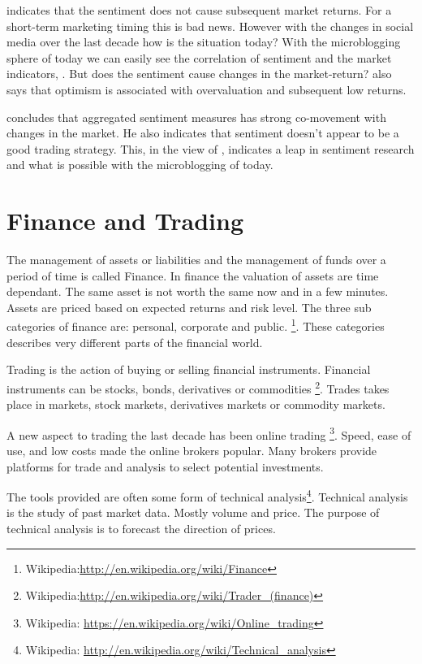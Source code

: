 \cite[p3]{Brown20041} indicates that the sentiment does not cause subsequent
market returns. For a short-term marketing timing this is bad news. However
with the changes in social media over the last decade how is the situation
today? With the microblogging sphere of today we can easily see the
correlation of sentiment and the market indicators,
\cite[]{annikajubbega11:twitter_driver_stock_price}. But
does the sentiment cause changes in the market-return?
\cite[p3]{Brown20041} also says that optimism is associated with overvaluation
and subsequent low returns.

\cite[p]{Brown20041} concludes that aggregated sentiment measures has strong
co-movement with changes in the market. He also indicates that sentiment
doesn't appear to be a good trading strategy. This, in the view of
\cite[]{Zhang201155}, indicates a leap in sentiment research and what is possible
with the microblogging of today.

\section{Finance and Trading}

The management of assets or liabilities and the management of funds over a
period of time is called Finance. In finance the valuation of assets are time
dependant. The same asset is not worth the same now and in a few minutes. Assets
are priced based on expected returns and risk level. The three sub categories
of finance are: personal, corporate and public. 
\footnote{Wikipedia:\url{http://en.wikipedia.org/wiki/Finance}}.
These categories describes very different parts of the financial world. 

Trading is the action of buying or selling financial instruments.
Financial instruments can be stocks, bonds, derivatives or commodities 
\footnote{Wikipedia:\url{http://en.wikipedia.org/wiki/Trader_(finance)}}.
Trades takes place in markets, stock markets, derivatives markets or commodity
markets.

A new aspect to trading the last decade has been online trading
\footnote{Wikipedia: \url{https://en.wikipedia.org/wiki/Online_trading}}.
Speed, ease of use, and low costs made the online brokers popular. Many brokers
provide platforms for trade and analysis to select potential investments.  

The tools provided are often some form of technical analysis\footnote{Wikipedia:
\url{http://en.wikipedia.org/wiki/Technical_analysis}}. Technical analysis is
the study of past market data. Mostly volume and price. The purpose of technical
analysis is to forecast the direction of prices.  


